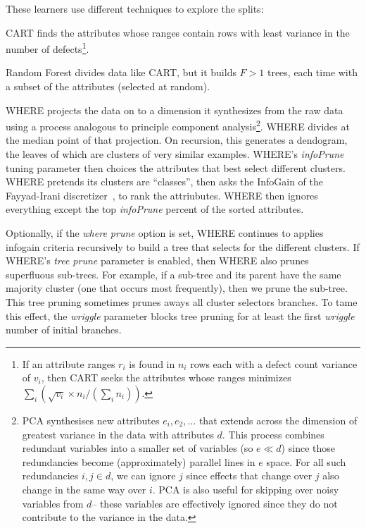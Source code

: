 These learners use different techniques to explore the splits:
\bi
\item
CART finds the attributes whose ranges contain rows with least variance in the number
of defects\footnote{If an attribute ranges $r_i$ is found in 
$n_i$ rows each with a  defect count variance of $v_i$, then CART seeks the attributes
whose ranges minimizes $\sum_i \left(\sqrt{v_i}\times n_i/(\sum_i n_i)\right)$.}.
\item
Random Forest    divides data like CART,
but it builds $F>1$  trees, each time with a subset of
the attributes (selected at random). 
\item
WHERE projects the data on to a dimension it synthesizes from the raw data using
a process analogous to principle component analysis\footnote{
PCA  synthesises  new
attributes $e_i, e_2,...$
that extends across the dimension of greatest  variance in the data  with attributes $d$.  
This process  combines
redundant  variables into a smaller set of variables  (so $e \ll d$) since those
redundancies become (approximately) parallel lines
in $e$ space. For all such redundancies \mbox{$i,j \in d$}, we 
can ignore $j$ 
since effects that change over $j$ also
change in the same way over $i$.
PCA is also useful for skipping over noisy variables from $d$-- these
variables are effectively ignored since    they  do not contribute to the variance in the data.}.
WHERE   divides  at the median point of that projection. On recursion,
this generates a dendogram, the leaves of which are clusters of  very similar examples.
\ei
WHERE's {\em infoPrune} tuning parameter then choices the
attributes   that best select  different clusters.
WHERE pretends its clusters are ``classes'', then 
asks the InfoGain of the
Fayyad-Irani discretizer~\cite{FayIra93Multi}, to rank the attriubutes.
WHERE then ignores everything except the top   {\em infoPrune} percent of the sorted
attributes.

Optionally, if the {\em where prune} option is set, 
WHERE  continues to applies infogain criteria  recursively to build a tree that selects for the
different clusters. If WHERE's {\em tree prune} parameter is enabled, then WHERE also prunes  superfluous sub-trees. For example, if a sub-tree and its parent have the same 
majority cluster
(one that occurs most frequently), then we prune the sub-tree.
This tree pruning  sometimes
prunes aways all  cluster selectors branches. To tame this effect, the {\em wriggle} parameter
blocks tree pruning for at least the first {\em wriggle} number of initial branches.

